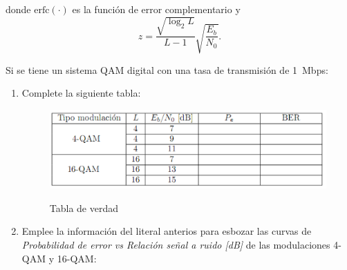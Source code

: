 \begin{enumerate}
\begin{enumerate}
donde $\mbox{erfc}(\cdot)$ es la función de error complementario y $$z=\frac{\sqrt{\log_2 L}}{L-1}\sqrt{\frac{E_b}{N_0}}.$$

Si se tiene un sistema QAM digital con una tasa de transmisión de 1~Mbps:

\begin{enumerate}
	
\item Complete la siguiente tabla:\\
	


\begin{figure}[h!]
	\captionsetup{justification = raggedright, singlelinecheck = false}
	\caption{Tabla de verdad} 
	\centering
	\includegraphics[scale=0.8]{Imagenes/tabla1.png}
	\label{fig:tabla21}
\end{figure}

	\item Emplee la información del literal anterios para esbozar las curvas de \textit{Probabilidad de error vs Relación señal a ruido [dB]} de las modulaciones 4-QAM y 16-QAM:


\end{enumerate}
\end{enumerate}
\end{enumerate}
